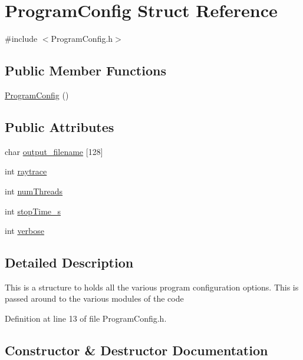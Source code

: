 \hypertarget{struct_program_config}{}\section{Program\+Config Struct Reference}
\label{struct_program_config}


{\ttfamily \#include $<$Program\+Config.\+h$>$}

\subsection*{Public Member Functions}
\begin{DoxyCompactItemize}
\item 
\hyperlink{struct_program_config_ac2d47c453cf5f99370097f9aa8c75ded}{Program\+Config} ()
\end{DoxyCompactItemize}
\subsection*{Public Attributes}
\begin{DoxyCompactItemize}
\item 
char \hyperlink{struct_program_config_a6673c608d617371fda38de237c9cab1e}{output\+\_\+filename} \mbox{[}128\mbox{]}
\item 
int \hyperlink{struct_program_config_a2e5a432549c56826d91022c2acd4ad71}{raytrace}
\item 
int \hyperlink{struct_program_config_ad3a77eb9d22a5ab56326a798cc8428d2}{num\+Threads}
\item 
int \hyperlink{struct_program_config_a19e30fc75258bd6a0d571432cb8c28ed}{stop\+Time\+\_\+s}
\item 
int \hyperlink{struct_program_config_ad059c9912c59ac0e8271114a4bb87c98}{verbose}
\end{DoxyCompactItemize}


\subsection{Detailed Description}
This is a structure to holds all the various program configuration options. This is passed around to the various modules of the code 

Definition at line 13 of file Program\+Config.\+h.



\subsection{Constructor \& Destructor Documentation}
\mbox{\label{struct_program_config_ac2d47c453cf5f99370097f9aa8c75ded}} 
